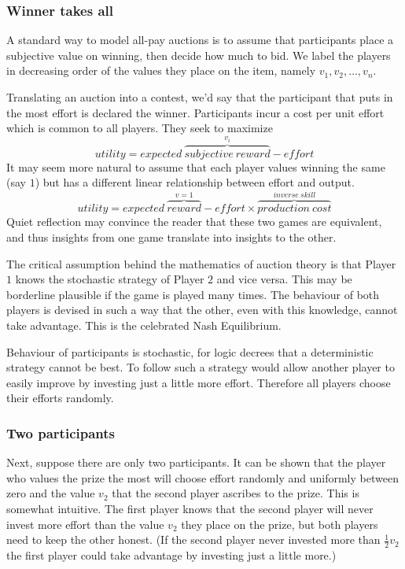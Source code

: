 \subsubsection{Winner takes all}

A standard way to model all-pay auctions is to assume that participants place a subjective value on winning, then decide how much to bid. We label the players in decreasing order of the values they place on the item, namely $v_1,v_2,\dots,v_n$. 

Translating an auction into a contest, we'd say that the participant that puts in the most effort is declared the winner. Participants incur a cost per unit effort which is common to all players. They seek to maximize 
$$
           utility  =   expected\ \overbrace{subjective\ reward}^{v_i} - effort  
$$
It may seem more natural to assume that each player values winning the same (say $1$) but has a different linear relationship between effort and output. 
$$
           utility = expected\ \overbrace{reward}^{v=1} - effort \times \overbrace{production\ cost}^{inverse\ skill}
$$
Quiet reflection may convince the reader that these two games are equivalent, and thus insights from one game translate into insights to the other. 

The critical assumption behind the mathematics of auction theory is that Player $1$ knows the stochastic strategy of Player $2$ and vice versa. This may be borderline plausible if the game is played many times. The behaviour of both players is devised in such a way that the other, even with this knowledge, cannot take advantage. This is the celebrated Nash Equilibrium.

Behaviour of participants is stochastic, for logic decrees that a deterministic strategy cannot be best. To follow such a strategy would allow another player to easily improve by investing just a little more effort. Therefore all players choose their efforts randomly. 


\subsubsection{Two participants}

Next, suppose there are only two participants. It can be shown that the player who values the prize the most will choose effort randomly and uniformly between zero and the value $v_2$ that the second player ascribes to the prize. This is somewhat intuitive. The first player knows that the second player will never invest more effort than the value $v_2$ they place on the prize, but both players need to keep the other honest. (If the second player never invested more than $\frac{1}{2}v_2$ the first player could take advantage by investing just a little more.) 

